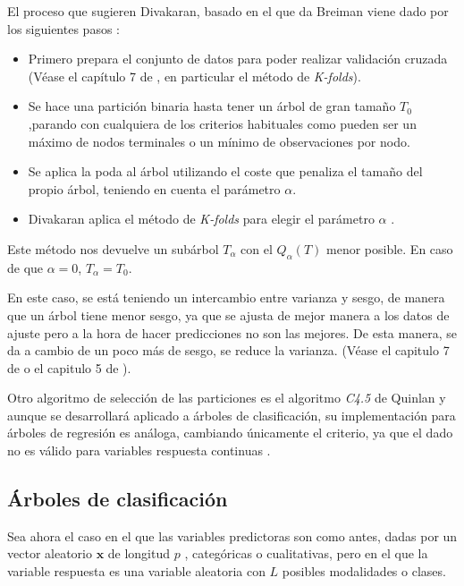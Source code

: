 \noindent El proceso que sugieren Divakaran, basado en el que da Breiman  viene dado por los siguientes pasos \cite{Breiman 1984,Divakaran 2022}:
\begin{itemize}
\item Primero prepara el conjunto de datos para poder realizar validación cruzada (Véase el capítulo 7 de \cite{Hastie 2001}, en particular el método de \emph{K-folds}).

\item Se hace una partición binaria hasta tener un árbol de gran tamaño $T_0$,parando con cualquiera de los criterios habituales como pueden ser un máximo de nodos terminales o un mínimo de observaciones por nodo. 

\item Se aplica la poda al árbol utilizando el coste que penaliza el tamaño del propio árbol, teniendo en cuenta el parámetro $\alpha$. 

\item Divakaran aplica el método de \emph{K-folds} para elegir el parámetro $\alpha$ \cite{Divakaran 2022}.
\end{itemize}

\noindent Este método nos devuelve un subárbol $T_{\alpha}$ con el $Q_{\alpha}(T)$ menor posible. En caso de que $\alpha=0$, $T_{\alpha}=T_0$.

\noindent En este caso, se está teniendo un intercambio entre varianza y sesgo, de manera que un árbol tiene menor sesgo, ya que se ajusta de mejor manera a los datos de ajuste pero a la hora de hacer predicciones no son las mejores. De esta manera, se da a cambio de un poco más de sesgo, se reduce la varianza. (Véase el capitulo 7 de \cite{Hastie 2001} o el capitulo 5 de \cite{James 2013}).

\noindent Otro algoritmo de selección de las particiones es el algoritmo \emph{C4.5} de Quinlan y aunque se desarrollará aplicado a árboles de clasificación, su implementación para árboles de regresión es análoga, cambiando únicamente el criterio, ya que el dado no es válido para variables respuesta continuas \cite{Quinlan 2014}. 

\subsection{Árboles de clasificación}

\noindent Sea ahora el caso en el que las variables predictoras son como antes, dadas por un vector aleatorio $\mathbf{x}$ de longitud $p$ , categóricas o cualitativas, pero en el que la variable respuesta es una variable aleatoria con $L$ posibles modalidades o clases.

